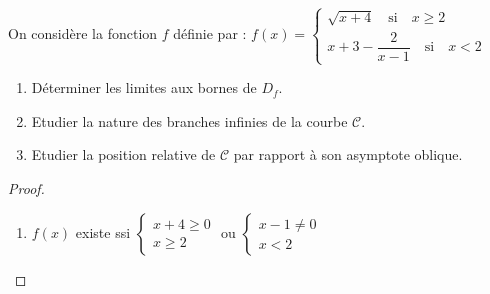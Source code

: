\begin{example}



\begin{exercice}
On considère la fonction $ f $ définie par :
$ f (x)=\left\{\begin{array}{l} \sqrt{x +4}\quad \text{si} \quad x\geq 2 \\ x+3-\dfrac{2}{x-1}\quad \text{si}\quad x< 2  \end{array} \right.$

\begin{enumerate}
\item Déterminer  les limites aux bornes de $ D_{f} $.
\item Etudier la nature des branches infinies de la courbe $ \mathcal{C} $.
\item Etudier la position relative de $ \mathcal{C} $ par rapport à son asymptote oblique.
\end{enumerate}
\end{exercice}
\begin{proof}
\begin{enumerate}
\item $ f(x) $ existe ssi $ \begin{cases} x+4 \geq 0 \\ x\geq 2\end{cases}$  ou $ \begin{cases} x-1 \neq 0 \\ x< 2\end{cases}$


\end{enumerate}
\end{proof}
\end{example}
